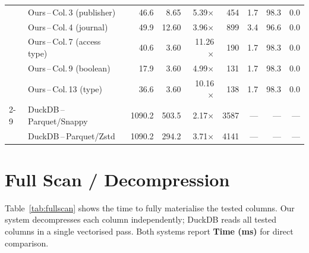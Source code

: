 \documentclass[a4paper,11pt]{article}
\begin{document}
\begin{table}[h]
{\begin{tabular}{llrrrrrrr}
  & Ours\,--\,Col.\,3  (publisher)   &  46.6 &   8.65 &  5.39$\times$ &   454 &   1.7 &  98.3 &   0.0 \\
  & Ours\,--\,Col.\,4  (journal)     &  49.9 &  12.60 &  3.96$\times$ &   899 &   3.4 &  96.6 &   0.0 \\
  & Ours\,--\,Col.\,7  (access type) &  40.6 &   3.60 & 11.26$\times$ &   190 &   1.7 &  98.3 &   0.0 \\
  & Ours\,--\,Col.\,9  (boolean)     &  17.9 &   3.60 &  4.99$\times$ &   131 &   1.7 &  98.3 &   0.0 \\
  & Ours\,--\,Col.\,13 (type)        &  36.6 &   3.60 & 10.16$\times$ &   138 &   1.7 &  98.3 &   0.0 \\
\cmidrule{2-9}
  & DuckDB\,--\,Parquet/Snappy       & 1090.2 & 503.5 &  2.17$\times$ &  3587 & --- & --- & --- \\
  & DuckDB\,--\,Parquet/Zstd         & 1090.2 & 294.2 &  3.71$\times$ &  4141 & --- & --- & --- \\
\bottomrule
\end{tabular}}
\end{table}

\newpage
\section{Full Scan / Decompression}

Table~\ref{tab:fullscan} shows the time to fully materialise the tested
columns. Our system decompresses each column independently; DuckDB
reads all tested columns in a single vectorised pass. Both systems
report \textbf{Time (ms)} for direct comparison.
\end{document}
